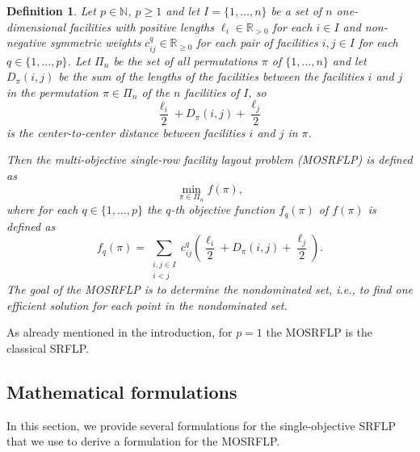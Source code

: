 \documentclass{article}
\newcommand{\SRFLP}{SRFLP\xspace}
\newcommand{\MOSRFLP}{MOSRFLP\xspace}
\newtheorem{definition}[theorem]{Definition}
\begin{document}
\begin{definition}
\label{def:MO-SRFLP}
Let $p \in \mathbb{N}$, $p\geq 1$ and let $I = \{1,  \dots, n\}$ be a set of $n$ one-dimensional facilities with positive lengths 
$\ell_i \in \mathbb{R}_{>0}$ for each $i \in I$ and non-negative symmetric weights $c_{ij}^q \in \mathbb{R}_{\geq0}$ for each
pair of facilities $i,j \in I$ for each $q \in \{1, \dots, p\}$.
Let $\Pi_n$ be the set of all permutations $\pi$ of $\{1, \dots, n\}$ 
and let $D_{\pi}(i,j)$ be the sum of the lengths of the facilities between 
the facilities $i$ and $j$ in the permutation $\pi \in \Pi_n$ of the $n$ facilities of $I$, so 
$$\frac{\ell_i}{2} + D_{\pi}(i,j) + \frac{\ell_j}{2}$$
is the center-to-center distance between facilities $i$ and $j$ in $\pi$.

Then the \emph{multi-objective single-row facility layout problem (\MOSRFLP)} is defined as
\begin{equation*}
    \min_{\pi \in \Pi_n} f(\pi),  
\end{equation*}
where for each $q \in \{1, \dots, p\}$ the $q$-th objective function $f_q(\pi)$ of $f(\pi)$ is defined as 
\begin{equation*}
    f_q(\pi) =  \sum_{\substack{i,j \in I \\ i < j}} c_{ij}^q 
    \left( \frac{\ell_i}{2} + D_{\pi}(i,j) + \frac{\ell_j}{2} \right). 
\end{equation*}
The goal of the \MOSRFLP is to determine the nondominated set, i.e., to find one efficient solution for each point in the nondominated set.
 
\end{definition} 

As already mentioned in the introduction, for $p=1$ the \MOSRFLP is the classical \SRFLP.

\subsection{Mathematical formulations}\label{sec:mathForm}
In this section, we provide several formulations for the single-objective \SRFLP that we use to derive a formulation for the \MOSRFLP.
\end{document}
